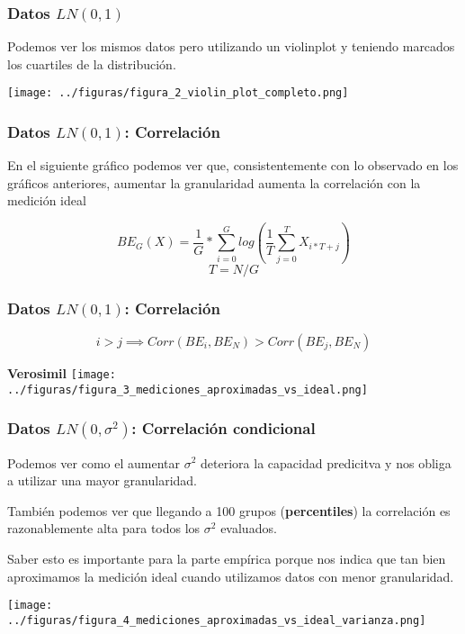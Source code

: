 \documentclass[10pt,mathserif]{beamer}%
\begin{document}
\begin{frame}
    \frametitle{Datos $LN(0,1)$}
    \begin{multicols}{2}
        \begin{minipage}{\linewidth}
            Podemos ver los mismos datos pero utilizando un violinplot y teniendo marcados los cuartiles de la distribución.

        \end{minipage}

        \begin{minipage}{\linewidth}
            \centering
            \texttt{[image: ../figuras/figura\_2\_violin\_plot\_completo.png]} %
        \end{minipage}

    \end{multicols}
\end{frame}

\begin{frame}
    \frametitle{Datos $LN(0,1)$: Correlación}
    En el siguiente gráfico podemos ver que, consistentemente con lo observado en los gráficos anteriores, aumentar la granularidad aumenta la correlación con la medición ideal
    \begin{definition}[$BE_G$]
        $$ BE_G(X) = \frac{1}{G} * \sum_{i=0}^G log(\frac{1}{T} \sum_{j = 0}^{T} X_{i*T+j}) $$
        $$ T = N/G$$
    \end{definition}
\end{frame}

\begin{frame}
    \frametitle{Datos $LN(0,1)$: Correlación}
    \begin{conjecture}
        $$i>j \implies Corr(BE_i,BE_N) > Corr(BE_j,BE_N)$$ 
    \end{conjecture}
    \pause
    \textbf{Verosimil}
    \texttt{[image: ../figuras/figura\_3\_mediciones\_aproximadas\_vs\_ideal.png]} %
\end{frame}

\begin{frame}
    \frametitle{Datos $LN(0,\sigma^2)$: Correlación condicional}
    Podemos ver como el aumentar $\sigma^2$ deteriora la capacidad predicitva y nos obliga a utilizar una mayor granularidad.

    También podemos ver que llegando a 100 grupos (\textbf{percentiles}) la correlación es razonablemente alta para todos los $\sigma^2$ evaluados.

    Saber esto es importante para la parte empírica porque nos indica que tan bien aproximamos la medición ideal cuando utilizamos datos con menor granularidad.

    \texttt{[image: ../figuras/figura\_4\_mediciones\_aproximadas\_vs\_ideal\_varianza.png]} %

\end{frame}
\end{document}
